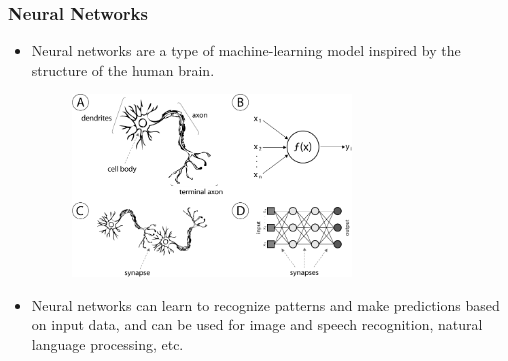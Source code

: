 
\begin{frame}
\frametitle{Neural Networks}
\begin{itemize}
\item Neural networks are a type of machine-learning model inspired by the structure of the human brain.
\begin{figure}[h]
\centering
\includegraphics[width=0.7\textwidth]{figures/neural_brain.png}
\end{figure}
\item Neural networks can learn to recognize patterns and make predictions based on input data, and can be used for image and speech recognition, natural language processing, etc.

\end{itemize}
\end{frame}


